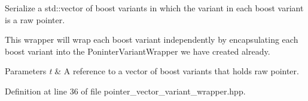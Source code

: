 Serialize a std\+::vector of boost variants in which the variant in each boost variant is a raw pointer. 

This wrapper will wrap each boost variant independently by encapsulating each boost variant into the Poninter\+Variant\+Wrapper we have created already.


\begin{DoxyParams}{Parameters}
{\em t} & A reference to a vector of boost variants that holds raw pointer. \\
\hline
\end{DoxyParams}


Definition at line 36 of file pointer\+\_\+vector\+\_\+variant\+\_\+wrapper.\+hpp.

